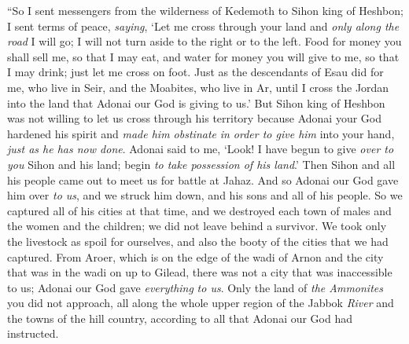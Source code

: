 \begin{biblechapter}
\verse “So I sent messengers from the wilderness of Kedemoth to Sihon king of Heshbon; I sent terms of peace, \textit{saying},
\verse ‘Let me cross through your land and \textit{only along the road} I will go; I will not turn aside to the right or to the left.
\verse Food for money you shall sell me, so that I may eat, and water for money you will give to me, so that I may drink; just let me cross on foot.
\verse Just as the descendants of Esau did for me, who live in Seir, and the Moabites, who live in Ar, until I cross the Jordan into the land that Adonai our God is giving to us.’
\verse But Sihon king of Heshbon was not willing to let us cross through his territory because Adonai your God hardened his spirit and \textit{made him obstinate} \textit{in order to give him} into your hand, \textit{just as he has now done}.
\verse Adonai said to me, ‘Look! I have begun to give \textit{over to you} Sihon and his land; begin \textit{to take possession of his land}.’
\verse Then Sihon and all his people came out to meet us for battle at Jahaz.
\verse And so Adonai our God gave him over \textit{to us}, and we struck him down, and his sons and all of his people.
\verse So we captured all of his cities at that time, and we destroyed each town of males and the women and the children; we did not leave behind a survivor.
\verse We took only the livestock as spoil for ourselves, and also the booty of the cities that we had captured.
\verse From Aroer, which is on the edge of the wadi of Arnon and the city that was in the wadi on up to Gilead, there was not a city that was inaccessible to us; Adonai our God gave \textit{everything} \textit{to us}.
\verse Only the land of \textit{the Ammonites} you did not approach, all along the whole upper region of the Jabbok \textit{River} and the towns of the hill country, according to all that Adonai our God had instructed.
\end{biblechapter}

